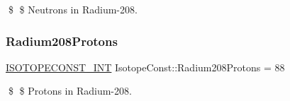 \$ \$ Neutrons in Radium-\/208. \mbox{\label{group___isotope_const-_radium-_ra208_gae6285e48c345de448e9c97e7ee243399}} 
\subsubsection{\texorpdfstring{Radium208\+Protons}{Radium208Protons}}
{\footnotesize\ttfamily \mbox{\hyperlink{group___isotope_const-_macros_ga5f18360b3e99483a35c32d789e62621c}{I\+S\+O\+T\+O\+P\+E\+C\+O\+N\+S\+T\+\_\+\+I\+NT}} Isotope\+Const\+::\+Radium208\+Protons = 88}

\$ \$ Protons in Radium-\/208. 
